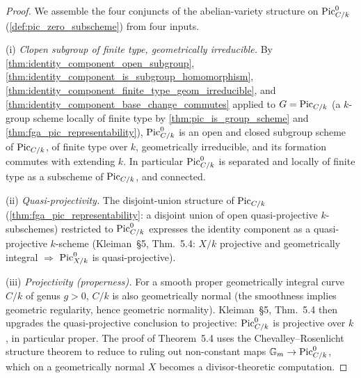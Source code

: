 \begin{proof}
  We assemble the four conjuncts of the abelian-variety structure on
  \(\operatorname{Pic}^0_{C/k}\) (\cref{def:pic_zero_subscheme}) from four inputs.

  (i) \emph{Clopen subgroup of finite type, geometrically irreducible.}
  By
  \cref{thm:identity_component_open_subgroup},
  \cref{thm:identity_component_is_subgroup_homomorphism},
  \cref{thm:identity_component_finite_type_geom_irreducible}, and
  \cref{thm:identity_component_base_change_commutes}
  applied to \(G = \operatorname{Pic}_{C/k}\) (a \(k\)-group scheme locally of finite
  type by
  \cref{thm:pic_is_group_scheme} and \cref{thm:fga_pic_representability}),
  \(\operatorname{Pic}^0_{C/k}\) is an open and closed subgroup scheme of \(\operatorname{Pic}_{C/k}\),
  of finite type over \(k\), geometrically irreducible, and its
  formation commutes with extending \(k\). In particular \(\operatorname{Pic}^0_{C/k}\)
  is separated and locally of finite type as a subscheme of
  \(\operatorname{Pic}_{C/k}\), and connected.

  (ii) \emph{Quasi-projectivity.} The disjoint-union structure of
  \(\operatorname{Pic}_{C/k}\) (\cref{thm:fga_pic_representability}: a disjoint union
  of open quasi-projective \(k\)-subschemes) restricted to \(\operatorname{Pic}^0_{C/k}\)
  expresses the identity component as a quasi-projective \(k\)-scheme
  (Kleiman~\S 5, Thm.~5.4: \(X/k\) projective and geometrically
  integral \(\Longrightarrow\) \(\operatorname{Pic}^0_{X/k}\) is quasi-projective).

  (iii) \emph{Projectivity (properness).} For a smooth proper
  geometrically integral curve \(C/k\) of genus \(g > 0\), \(C/k\) is
  also geometrically normal (the smoothness implies geometric
  regularity, hence geometric normality). Kleiman~\S 5, Thm.~5.4
  then upgrades the quasi-projective conclusion to projective:
  \(\operatorname{Pic}^0_{C/k}\) is projective over \(k\), in particular proper.
  The proof of Theorem~5.4 uses the Chevalley--Rosenlicht structure
  theorem to reduce to ruling out non-constant maps
  \(\mathbb G_m \to \operatorname{Pic}^0_{C/k}\), which on a geometrically normal
  \(X\) becomes a divisor-theoretic computation.


\end{proof}
